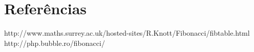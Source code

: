 \section{Referências}

\indent [1] http://www.maths.surrey.ac.uk/hosted-sites/R.Knott/Fibonacci/fibtable.html \\
\indent [2] http://php.bubble.ro/fibonacci/

